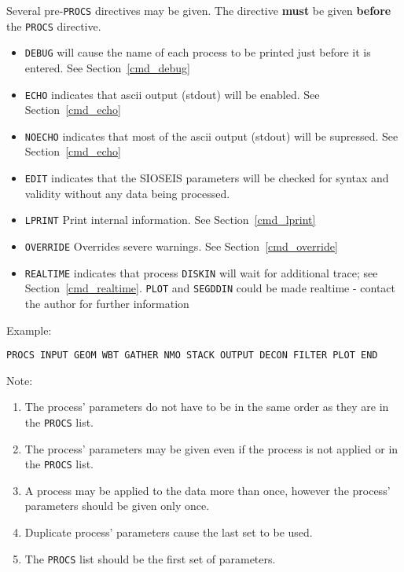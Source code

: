Several pre-\texttt{PROCS} directives may be given. The directive \textbf{must}
be given \textbf{before} the \texttt{PROCS} directive.
\begin{itemize}
    \item \texttt{DEBUG} will cause the name of each process to be printed just
          before it is entered. See Section~\ref{cmd_debug}
    \item \texttt{ECHO} indicates that \gls{ascii} output (stdout) will be enabled.
          See Section~\ref{cmd_echo}
    \item \texttt{NOECHO} indicates that most of the \gls{ascii} output (stdout) will
          be supressed. See Section~\ref{cmd_echo}
    \item \texttt{EDIT} indicates that the SIOSEIS parameters will be checked
          for syntax and validity without any data being processed.
    \item \texttt{LPRINT} Print internal information.
          See Section~\ref{cmd_lprint}
    \item \texttt{OVERRIDE} Overrides severe warnings.
          See Section~\ref{cmd_override}
    \item \texttt{REALTIME} indicates that process \texttt{DISKIN} will
          wait for additional trace; see Section~\ref{cmd_realtime}.
          \texttt{PLOT} and \texttt{SEGDDIN} could be made realtime - contact
          the author for further information
\end{itemize}

Example:

\begin{verbatim}
PROCS INPUT GEOM WBT GATHER NMO STACK OUTPUT DECON FILTER PLOT END
\end{verbatim}

Note:
\begin{enumerate}
\item The process' parameters do not have to be in the same order as  they are in the \texttt{PROCS} list.
\item The process' parameters may be given even if the process is not applied or in the \texttt{PROCS} list.
\item A process may be applied to the data more than once, however the process' parameters should be given only once.
\item Duplicate process' parameters cause the last set to be used.
\item The \texttt{PROCS} list should be the first set of parameters.
\end{enumerate}

